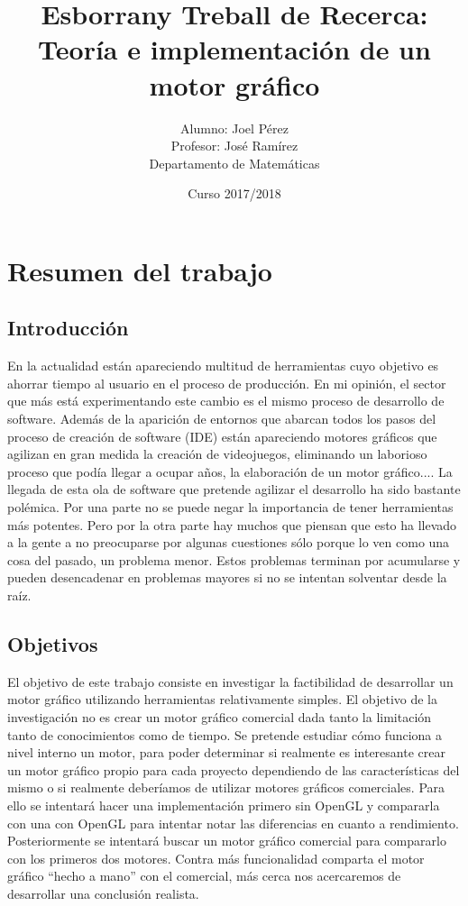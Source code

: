 \documentclass{article}
\title{Esborrany Treball de Recerca:\\Teoría e implementación de un motor gráfico}
\date{Curso 2017/2018}
\author{Alumno: Joel Pérez\\Profesor: José Ramírez\\Departamento de Matemáticas}
\begin{document}
\lstset{language=C, basicstyle=\ttfamily}

\maketitle


\newpage


\tableofcontents

\newpage



\section{Resumen del trabajo}
\subsection{Introducción}
En la actualidad están apareciendo multitud de herramientas cuyo objetivo es ahorrar tiempo al usuario en el proceso de producción. En mi opinión, el sector que más está experimentando este cambio es el mismo proceso de desarrollo de software. Además de la aparición de entornos que abarcan todos los pasos del proceso de creación de software (IDE) están apareciendo motores gráficos que agilizan en gran medida la creación de videojuegos, eliminando un laborioso proceso que podía llegar a ocupar años, la elaboración de un motor gráfico....
\newline
La llegada de esta ola de software que pretende agilizar el desarrollo ha sido bastante polémica. Por una parte no se puede negar la importancia de tener herramientas más potentes. Pero por la otra parte hay muchos que piensan que esto ha llevado a la gente a no preocuparse por algunas cuestiones sólo porque lo ven como una cosa del pasado, un problema menor. Estos problemas terminan por acumularse y pueden desencadenar en problemas mayores si no se intentan solventar desde la raíz.
\subsection{Objetivos}
El objetivo de este trabajo consiste en investigar la factibilidad de desarrollar un motor gráfico utilizando herramientas relativamente simples. El objetivo de la investigación no es crear un motor gráfico comercial dada tanto la limitación tanto de conocimientos como de tiempo. Se pretende estudiar cómo funciona a nivel interno un motor, para poder determinar si realmente es interesante crear un motor gráfico propio para cada proyecto dependiendo de las características del mismo o si realmente deberíamos de utilizar motores gráficos comerciales.
\newline
Para ello se intentará hacer una implementación primero sin OpenGL y compararla con una con OpenGL para intentar notar las diferencias en cuanto a rendimiento. Posteriormente se intentará buscar un motor gráfico comercial para compararlo con los primeros dos motores. Contra más funcionalidad comparta el motor gráfico ``hecho a mano'' con el comercial, más cerca nos acercaremos de desarrollar una conclusión realista.
\end{document}
